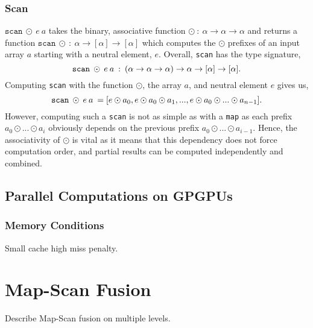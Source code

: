 \documentclass[11pt]{article}
\begin{document}

\subsubsection{Scan}
$\texttt{scan} \: \odot \: e \: a$ takes the binary, associative function $\odot \: : \: \alpha \to \alpha \to \alpha$ and returns a function
 $\mathtt{scan} \:\odot \: : \: \alpha \to [\alpha] \to [\alpha]$ which
 computes the $\odot$ prefixes of an input array $a$ starting with a neutral element, $e$. Overall, \texttt{scan} has the type signature,
$$\mathtt{scan} \: \odot \: e \: a \: : \:(\alpha \to \alpha \to \alpha) \to \alpha \to [\alpha] \to [\alpha]\mathnormal{.}$$
Computing \texttt{scan} with the function $\odot$, the array $a$, and neutral element $e$ gives us,
$$\mathtt{scan} \: \odot \: e \: a \: = [e \odot a_0, e \odot a_0 \odot a_1, ..., e \odot a_0 \odot ... \odot a_{n-1}]\mathnormal{.}$$
However, computing such a \texttt{scan} is not as simple as with a \texttt{map} as each prefix $a_0 \odot ... \odot a_i$ obviously depends on the previous prefix $a_0 \odot ... \odot a_{i-1}$. Hence, 
the associativity of $\odot$ is vital as it means that this dependency does not force computation order, and partial results can be computed independently and combined.


\subsection{Parallel Computations on GPGPUs}

\subsubsection{Memory Conditions}
Small cache high miss penalty.


\section{Map-Scan Fusion}
Describe Map-Scan fusion on multiple levels.
\end{document}
